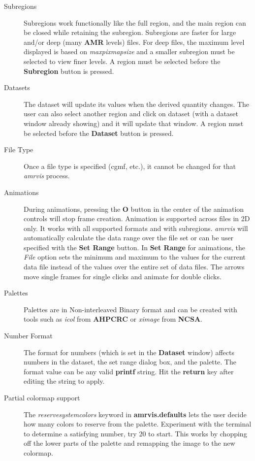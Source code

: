 \begin{description}
\item [Subregions] Subregions work functionally like the full region,
and the main region can be closed while retaining the subregion.
Subregions are faster for large and/or deep (many {\bf AMR} levels) files.
For deep files, the maximum level displayed is based on {\em maxpixmapsize}
and a smaller subregion must be selected to view finer levels.
A region must be selected before the {\bf Subregion} button is
pressed.

\item [Datasets]  The dataset will update its values when
the derived quantity changes.  The user can also select another region
and click on dataset (with a dataset window already showing) and it
will update that window.
A region must be selected before the {\bf Dataset} button is
pressed.

\item [File Type]
Once a file type is specified (cgmf, etc.), it cannot be changed for that
{\em amrvis} process.

\item [Animations] During animations, pressing the {\bf O} button
in the center of the animation controls will stop frame creation.
Animation is supported across files in 2D only.
It works with all supported formats and with subregions.
{\em amrvis} will automatically calculate the data range over
the file set or can be user specified with the {\bf Set Range} button.
In {\bf Set Range} for animations, the {\em File} option sets
the minimum and maximum to the values for the current data file
instead of the values over the entire set of data files.
The arrows move single frames for single
clicks and animate for double clicks.

\item [Palettes]
Palettes are in Non-interleaved Binary format and can be created
with tools such as {\em icol} from {\bf AHPCRC} or {\em ximage} from {\bf NCSA}.

\item [Number Format] The format for numbers (which is set in the
{\bf Dataset} window) affects numbers in the dataset, the set range
dialog box, and the palette.  The format value can be any valid {\bf printf}
string.  Hit the {\bf return} key after editing the string to apply.

\item [Partial colormap support]   The {\em reservesystemcolors} keyword
in {\bf amrvis.defaults} lets the user decide how many colors
to reserve from the palette.   Experiment with the terminal
to determine a satisfying number, try 20 to start.  This works
by chopping off the lower parts of the palette and remapping the
image to the new colormap.

\end{description}



